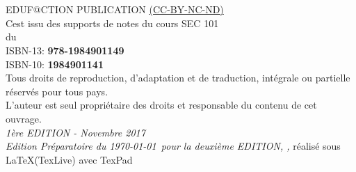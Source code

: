 


\newpage

~\vfill
\thispagestyle{empty}

\noindent {\Huge\ccbyncndeu}\\ 

 EDUF@CTION PUBLICATION \href{https://creativecommons.org/licenses/by-nc-nd/2.0/fr/}{(CC-BY-NC-ND)}\\ %

\noindent C\edoc est issu des supports de notes du cours SEC 101\\ 
du \uCnam \\

\noindent ISBN-13: \textbf{978-1984901149} \\

\noindent ISBN-10: \textbf{1984901141} \\

\noindent Tous droits de reproduction, d’adaptation et de traduction, intégrale ou partielle réservés pour tous pays.\\

\noindent L’auteur est seul propriétaire des droits et responsable du contenu de cet ouvrage.\\

\noindent \textit{1ère EDITION - Novembre 2017} \\

\noindent \textit{Edition Préparatoire du \today~pour la deuxième EDITION,  \printer, } réalisé sous \LaTeX (TexLive) avec TexPad \faApple
